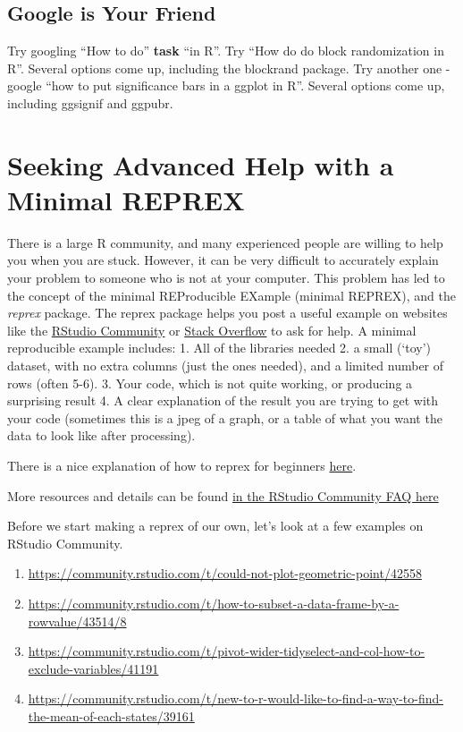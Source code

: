 \documentclass[
]{book}
\providecommand{\tightlist}{%
  \setlength{\itemsep}{0pt}\setlength{\parskip}{0pt}}
\begin{document}
\hypertarget{google-is-your-friend}{%
\subsection{Google is Your Friend}\label{google-is-your-friend}}

Try googling ``How to do'' \textbf{task} ``in R''.
Try ``How do do block randomization in R''.
Several options come up, including the blockrand package.
Try another one - google ``how to put significance bars in a ggplot in R''.
Several options come up, including ggsignif and ggpubr.

\hypertarget{seeking-advanced-help-with-a-minimal-reprex}{%
\section{Seeking Advanced Help with a Minimal REPREX}\label{seeking-advanced-help-with-a-minimal-reprex}}

There is a large R community, and many experienced people are willing to help you when you are stuck. However, it can be very difficult to accurately explain your problem to someone who is not at your computer.
This problem has led to the concept of the minimal REProducible EXample (minimal REPREX), and the \emph{reprex} package. The reprex package helps you post a useful example on websites like the \href{https://community.rstudio.com}{RStudio Community} or \href{https://stackoverflow.com}{Stack Overflow} to ask for help.
A minimal reproducible example includes:
1. All of the libraries needed
2. a small (`toy') dataset, with no extra columns (just the ones needed), and a limited number of rows (often 5-6).
3. Your code, which is not quite working, or producing a surprising result
4. A clear explanation of the result you are trying to get with your code (sometimes this is a jpeg of a graph, or a table of what you want the data to look like after processing).

There is a nice explanation of how to reprex for beginners \href{https://www.jessemaegan.com/post/so-you-ve-been-asked-to-make-a-reprex/}{here}.

More resources and details can be found \href{https://community.rstudio.com/t/faq-whats-a-reproducible-example-reprex-and-how-do-i-do-one/5219}{in the RStudio Community FAQ here}

Before we start making a reprex of our own, let's look at a few examples on RStudio Community.

\begin{enumerate}
\def\labelenumi{\arabic{enumi}.}
\tightlist
\item
  \url{https://community.rstudio.com/t/could-not-plot-geometric-point/42558}
\item
  \url{https://community.rstudio.com/t/how-to-subset-a-data-frame-by-a-rowvalue/43514/8}
\item
  \url{https://community.rstudio.com/t/pivot-wider-tidyselect-and-col-how-to-exclude-variables/41191}
\item
  \url{https://community.rstudio.com/t/new-to-r-would-like-to-find-a-way-to-find-the-mean-of-each-states/39161}
\end{enumerate}
\end{document}
